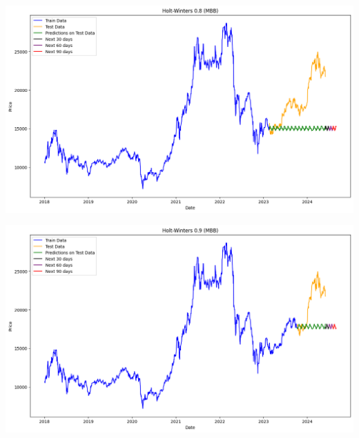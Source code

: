 \documentclass[conference]{IEEEtran}
\begin{document}
\begin{minipage}{0.23\textwidth}
    \centering
    \includegraphics[width=\linewidth]{images/Holt Winter/HW_MBB_82.png}
    \label{fig:image1}
\end{minipage}
\hfill
\begin{minipage}{0.23\textwidth}
    \centering
    \includegraphics[width=\linewidth]{images/Holt Winter/HW_MBB_91.png}
    \label{fig:image2}
\end{minipage}
\end{document}
